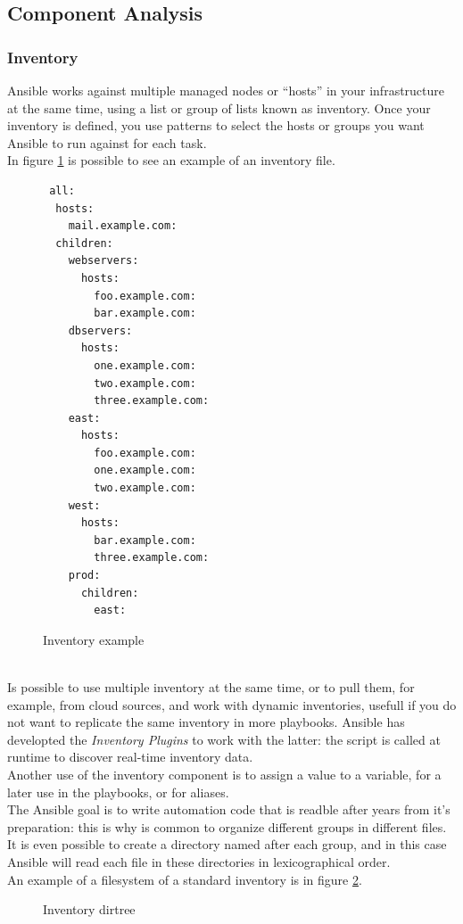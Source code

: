 \documentclass[conference]{IEEEtran}
\begin{document}
\subsection{Component Analysis}
\subsubsection{Inventory}
Ansible works against multiple managed nodes or “hosts” in your infrastructure at the same time, using a list or group of lists known as inventory. Once your inventory is defined, you use patterns to select the hosts or groups you want Ansible to run against for each task.\\
In figure \ref{inventory} is possible to see an example of an inventory file.\\
\begin{figure}[h]
\begin{verbatim}
 all:
  hosts:
    mail.example.com:
  children:
    webservers:
      hosts:
        foo.example.com:
        bar.example.com:
    dbservers:
      hosts:
        one.example.com:
        two.example.com:
        three.example.com:
    east:
      hosts:
        foo.example.com:
        one.example.com:
        two.example.com:
    west:
      hosts:
        bar.example.com:
        three.example.com:
    prod:
      children:
        east:
  \end{verbatim}
  \caption{Inventory example}
  \label{inventory}
\end{figure}\\
Is possible to use multiple inventory at the same time, or to pull them, for example, from cloud sources, and work with dynamic inventories, usefull if you do not want to replicate the same inventory in more playbooks. Ansible has developted the \textit{Inventory Plugins} to work with the latter: the script is called at runtime to discover real-time inventory data.\\
Another use of the inventory component is to assign a value to a variable, for a later use in the playbooks, or for aliases.\\
The Ansible goal is to write automation code that is readble after years from it's preparation: this is why is common to organize different groups in different files. It is even possible to create a directory named after each group, and in this case Ansible will read each file in these directories in lexicographical order.\\
An example of a filesystem of a standard inventory is in figure \ref{dirtree}.\\
\begin{figure}[h]
\caption{Inventory dirtree}
\label{dirtree}
\end{figure}
\end{document}
